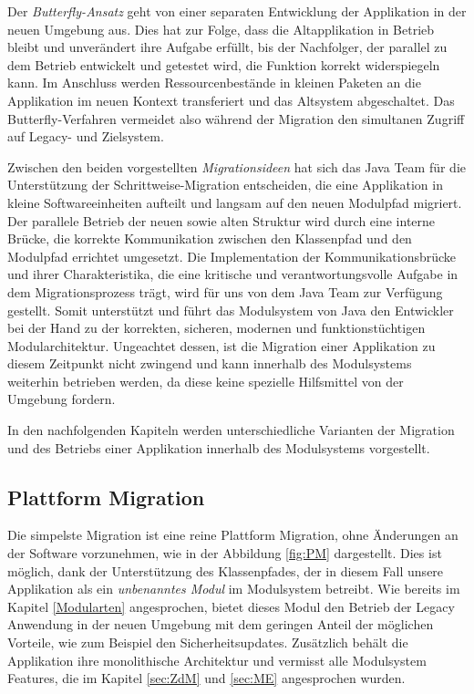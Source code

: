 	Der \textit{Butterfly-Ansatz} geht von einer separaten Entwicklung der Applikation in der neuen Umgebung aus. Dies hat zur Folge, dass die Altapplikation in Betrieb bleibt und unverändert ihre Aufgabe erfüllt, bis der Nachfolger, der parallel zu dem Betrieb entwickelt und getestet wird, die Funktion korrekt widerspiegeln kann. Im Anschluss werden Ressourcenbestände in kleinen Paketen an die Applikation im neuen Kontext transferiert und das Altsystem abgeschaltet. Das Butterfly-Verfahren vermeidet also während der Migration den simultanen Zugriff auf Legacy- und Zielsystem. \cite{sneed2016softwaremigration} \bigbreak

	Zwischen den beiden vorgestellten \textit{Migrationsideen} hat sich das Java Team für die Unterstützung der Schrittweise-Migration entscheiden, die eine Applikation in kleine Softwareeinheiten aufteilt und langsam auf den neuen Modulpfad migriert. Der parallele Betrieb der neuen sowie alten Struktur wird durch eine interne Brücke, die korrekte Kommunikation zwischen den Klassenpfad und den Modulpfad errichtet umgesetzt. Die Implementation der Kommunikationsbrücke und ihrer Charakteristika, die eine kritische und verantwortungsvolle Aufgabe in dem Migrationsprozess trägt, wird für uns von dem Java Team zur Verfügung gestellt. Somit unterstützt und führt das Modulsystem von Java den Entwickler bei der Hand zu der korrekten, sicheren, modernen und funktionstüchtigen Modularchitektur. \newline
	Ungeachtet dessen, ist die Migration einer Applikation zu diesem Zeitpunkt nicht zwingend und kann innerhalb des Modulsystems weiterhin betrieben werden, da diese keine spezielle Hilfsmittel von der Umgebung fordern.\bigbreak

	In den nachfolgenden Kapiteln werden unterschiedliche Varianten der Migration und des Betriebs einer Applikation innerhalb des Modulsystems vorgestellt. 


\subsection{Plattform Migration}
	Die simpelste Migration ist eine reine Plattform Migration, ohne Änderungen an der Software vorzunehmen, wie in der Abbildung \ref{fig:PM} dargestellt. Dies ist möglich, dank der Unterstützung des Klassenpfades, der in diesem Fall unsere Applikation als ein \textit{unbenanntes Modul} im Modulsystem betreibt. Wie bereits im Kapitel \ref{Modularten} angesprochen, bietet dieses Modul den Betrieb der Legacy Anwendung in der neuen Umgebung mit dem geringen Anteil der möglichen Vorteile, wie zum Beispiel den Sicherheitsupdates. Zusätzlich behält die Applikation ihre monolithische Architektur und vermisst alle Modulsystem Features, die im Kapitel \ref{sec:ZdM} und \ref{sec:ME} angesprochen wurden.

